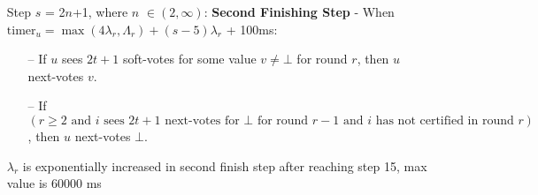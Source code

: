 \documentclass{article}
\begin{document}
\begin{enumerate}
        \item[] Step $s$ = 2$n$+1, where $n$ $\in (2, \infty)$: \textbf{Second Finishing Step} - When $\text{timer}_u = \max(4\lambda_r, \Lambda_r) + (s-5)\lambda_r$ + 100ms:
        \begin{itemize}
            \item[--] If $u$ sees $2t+1$ soft-votes for some value $v \neq \bot$ for round $r$, then $u$ next-votes $v$.
            \item[--] If $(r \geq 2 \text{ and } i \text{ sees } 2t+1 \text{ next-votes for } \bot \text{ for round } r-1 \text{ and } i \text{ has not certified in round } r)$, then $u$ next-votes $\bot$.
        \end{itemize}
        $\lambda_r$ is exponentially increased in second finish step after reaching step 15, max value is 60000 ms

    \end{enumerate}
\end{document}
